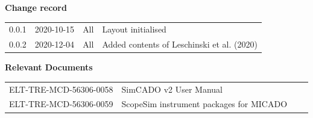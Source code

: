 \documentclass[a4paper,11pt]{article}
\begin{document}

\dmdmaketitle



\begin{center}
  \textbf{Change record}

  \tabletail{\hline}

  \begin{supertabular}{|l|l|l|l|}
   0.0.1 & 2020-10-15 & All & Layout initialised \\
   0.0.2 & 2020-12-04 & All & Added contents of Leschinski et al. (2020) \\
   \hline
  \end{supertabular}

\end{center}

\begin{center}
  \textbf{Relevant Documents}

  \tabletail{\hline}

  \begin{supertabular}{|l|l|l|l|}
   ELT-TRE-MCD-56306-0058 & SimCADO v2 User Manual \\
   ELT-TRE-MCD-56306-0059 & ScopeSim instrument packages for MICADO \\
   \hline
  \end{supertabular}

\end{center}
\end{document}
